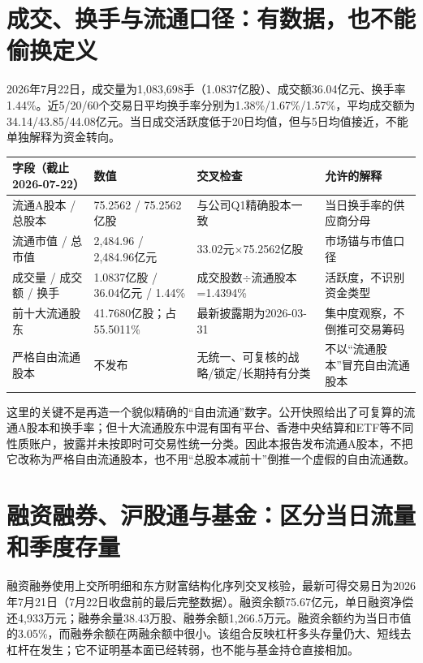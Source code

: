 \section{成交、换手与流通口径：有数据，也不能偷换定义}

2026年7月22日，成交量为1,083,698手（1.0837亿股）、成交额36.04亿元、换手率1.44\%。近5/20/60个交易日平均换手率分别为1.38\%/1.67\%/1.57\%，平均成交额为34.14/43.85/44.08亿元。当日成交活跃度低于20日均值，但与5日均值接近，不能单独解释为资金转向。

\begin{exhibitbox}
\small
\begin{tabularx}{\exhibitboxwidth}{L{3.3cm}R{3.0cm}L{4.0cm}X}
\toprule
\textbf{字段（截止2026-07-22）} & \textbf{数值} & \textbf{交叉检查} & \textbf{允许的解释} \\
\midrule
流通A股本 / 总股本 & 75.2562 / 75.2562亿股 & 与公司Q1精确股本一致 & 当日换手率的供应商分母 \\
流通市值 / 总市值 & 2,484.96 / 2,484.96亿元 & 33.02元$\times$75.2562亿股 & 市场锚与市值口径 \\
成交量 / 成交额 / 换手 & 1.0837亿股 / 36.04亿元 / 1.44\% & 成交股数$\div$流通股本=1.4394\% & 活跃度，不识别资金类型 \\
前十大流通股东 & 41.7680亿股；占55.5011\% & 最新披露期为2026-03-31 & 集中度观察，不倒推可交易筹码 \\
严格自由流通股本 & 不发布 & 无统一、可复核的战略/锁定/长期持有分类 & 不以“流通股本”冒充自由流通股本 \\
\bottomrule
\end{tabularx}
\end{exhibitbox}

这里的关键不是再造一个貌似精确的“自由流通”数字。公开快照给出了可复算的流通A股本和换手率；但十大流通股东中混有国有平台、香港中央结算和ETF等不同性质账户，披露并未按即时可交易性统一分类。因此本报告发布流通A股本，不把它改称为严格自由流通股本，也不用“总股本减前十”倒推一个虚假的自由流通数。

\section{融资融券、沪股通与基金：区分当日流量和季度存量}

融资融券使用上交所明细和东方财富结构化序列交叉核验，最新可得交易日为2026年7月21日（7月22日收盘前的最后完整数据）。融资余额75.67亿元，单日融资净偿还4,933万元；融券余量38.43万股、融券余额1,266.5万元。融资余额约为当日市值的3.05\%，而融券余额在两融余额中很小。该组合反映杠杆多头存量仍大、短线去杠杆在发生；它不证明基本面已经转弱，也不能与基金持仓直接相加。

